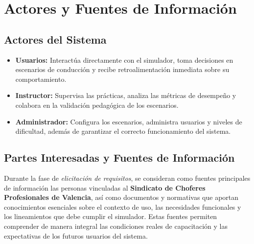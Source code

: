 \documentclass[12pt]{article}
\begin{document}
\section{Actores y Fuentes de Información}

\subsection{Actores del Sistema}
\begin{itemize}
    \item \textbf{Usuarios:} Interactúa directamente con el simulador, toma decisiones en escenarios de conducción y recibe retroalimentación inmediata sobre su comportamiento.
    \item \textbf{Instructor:} Supervisa las prácticas, analiza las métricas de desempeño y colabora en la validación pedagógica de los escenarios.
    \item \textbf{Administrador:} Configura los escenarios, administra usuarios y niveles de dificultad, además de garantizar el correcto funcionamiento del sistema.
\end{itemize}

\subsection{Partes Interesadas y Fuentes de Información}
Durante la fase de \textit{elicitación de requisitos}, se consideran como fuentes principales de información las personas vinculadas al \textbf{Sindicato de Choferes Profesionales de Valencia}, así como documentos y normativas que aportan conocimientos esenciales sobre el contexto de uso, las necesidades funcionales y los lineamientos que debe cumplir el simulador. Estas fuentes permiten comprender de manera integral las condiciones reales de capacitación y las expectativas de los futuros usuarios del sistema.
\end{document}
